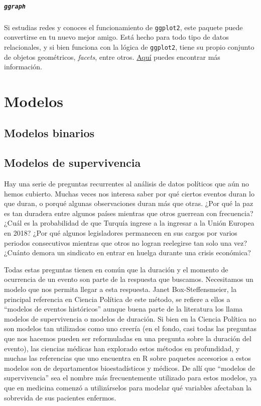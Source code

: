 \documentclass[]{book}
\begin{document}
\hypertarget{ggraph}{%
\subsubsection{\texorpdfstring{\texttt{ggraph}}{ggraph}}\label{ggraph}}

Si estudias redes y conoces el funcionamiento de \texttt{ggplot2}, este
paquete puede convertirse en tu nuevo mejor amigo. Está hecho para todo
tipo de datos relacionales, y si bien funciona con la lógica de
\texttt{ggplot2}, tiene su propio conjunto de objetos geométricos,
\emph{facets}, entre otros.
\href{https://github.com/thomasp85/ggraph}{Aquí} puedes encontrar más
información.

\hypertarget{part-modelos}{%
\part{Modelos}\label{part-modelos}}

\hypertarget{logit}{%
\chapter{Modelos binarios}\label{logit}}

\hypertarget{surv}{%
\chapter{Modelos de supervivencia}\label{surv}}

Hay una serie de preguntas recurrentes al análisis de datos políticos
que aún no hemos cubierto. Muchas veces nos interesa saber por qué
ciertos eventos duran lo que duran, o porqué algunas observaciones duran
más que otras. ¿Por qué la paz es tan duradera entre algunos países
mientras que otros guerrean con frecuencia? ¿Cuál es la probabilidad de
que Turquía ingrese a la ingresar a la Unión Europea en 2018? ¿Por qué
algunos legisladores permanecen en sus cargos por varios periodos
consecutivos mientras que otros no logran reelegirse tan solo una vez?
¿Cuánto demora un sindicato en entrar en huelga durante una crisis
económica?

Todas estas preguntas tienen en común que la duración y el momento de
ocurrencia de un evento son parte de la respuesta que buscamos.
Necesitamos un modelo que nos permita llegar a esta respuesta. Janet
Box-Steffensmeier, la principal referencia en Ciencia Política de este
método, se refiere a ellos a ``modelos de eventos históricos'' aunque
buena parte de la literatura los llama modelos de supervivencia o
modelos de duración. Si bien en la Ciencia Política no son modelos tan
utilizados como uno creería (en el fondo, casi todas las preguntas que
nos hacemos pueden ser reformuladas en una pregunta sobre la duración
del evento), las ciencias médicas han explorado estos métodos en
profundidad, y muchas las referencias que uno encuentra en R sobre
paquetes accesorios a estos modelos son de departamentos bioestadísticos
y médicos. De allí que ``modelos de supervivencia'' sea el nombre más
frecuentemente utilizado para estos modelos, ya que en medicina comenzó
a utilizárselos para modelar qué variables afectaban la sobrevida de sus
pacientes enfermos.
\end{document}
